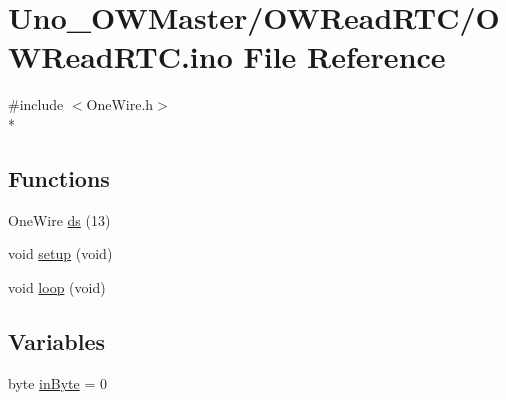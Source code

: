 \hypertarget{OWReadRTC_8ino}{\section{Uno\-\_\-\-O\-W\-Master/\-O\-W\-Read\-R\-T\-C/\-O\-W\-Read\-R\-T\-C.ino File Reference}
\label{OWReadRTC_8ino}
}
{\ttfamily \#include $<$One\-Wire.\-h$>$}\\*
\subsection*{Functions}
\begin{DoxyCompactItemize}
\item 
One\-Wire \hyperlink{OWReadRTC_8ino_a7ac2589d8de3c5bc02dcfe7fc62068e7}{ds} (13)
\item 
void \hyperlink{OWReadRTC_8ino_a7dfd9b79bc5a37d7df40207afbc5431f}{setup} (void)
\item 
void \hyperlink{OWReadRTC_8ino_a0b33edabd7f1c4e4a0bf32c67269be2f}{loop} (void)
\end{DoxyCompactItemize}
\subsection*{Variables}
\begin{DoxyCompactItemize}
\item 
byte \hyperlink{OWReadRTC_8ino_a62cd173143ff9c15a38fd17ab56970c9}{in\-Byte} = 0
\end{DoxyCompactItemize}


